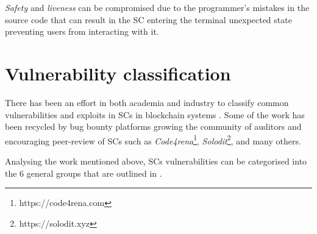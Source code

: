 \documentclass[oneside]{ecsproject}     %
\begin{document}
\textit{Safety} and \textit{liveness} can be compromised due to the programmer's mistakes in the source code that can result in the SC entering the terminal unexpected state
preventing users from interacting with it\cite{ondo_report}.


\section{Vulnerability classification}

There has been an effort in both academia and industry to classify common vulnerabilities 
and exploits in SCs in blockchain systems \cite{owasp}\cite{stefano}\cite{atzei_survey}. 
Some of the work has been recycled by bug bounty platforms growing the community of auditors
and encouraging peer-review of SCs such as \textit{Code4rena}\footnote{https://code4rena.com}, \textit{Solodit}\footnote{https://solodit.xyz},
and many others.

Analysing the work mentioned above, SCs vulnerabilities can be categorised into the 6 general groups that are outlined in .
\end{document}
